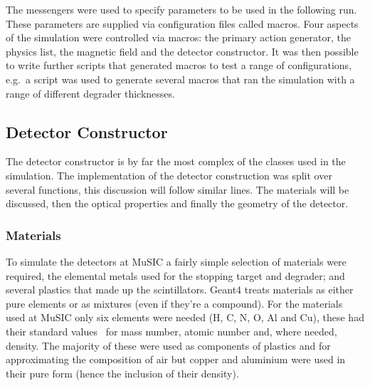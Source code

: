 The messengers were used to specify parameters to be used in the following run. These parameters are supplied via configuration files called macros. Four aspects of the simulation were controlled via macros: the primary action generator, the physics list, the magnetic field and the detector constructor. It was then possible to write further scripts that generated macros to test a range of configurations, e.g.\ a script was used to generate several macros that ran the simulation with a range of different degrader thicknesses.

\subsection{Detector Constructor} %
\label{sec:detector_constructor}
The detector constructor is by far the most complex of the classes used in the simulation. The implementation of the detector construction was split over several functions, this discussion will follow similar lines. The materials will be discussed, then the optical properties and finally the geometry of the detector.

\subsubsection{Materials} %
\label{ssub:implementation_materials}

To simulate the detectors at MuSIC a fairly simple selection of materials were required, the elemental metals used for the stopping target and degrader; and several plastics that made up the scintillators. Geant4 treats materials as either pure elements or as mixtures (even if they're a compound). For the materials used at MuSIC only six elements were needed (H, C, N, O, Al and Cu), these had their standard values~\cite{Some reference for elements} for mass number, atomic number and, where needed, density. The majority of these were used as components of plastics and for approximating the composition of air but copper and aluminium were used in their pure form (hence the inclusion of their density). 

